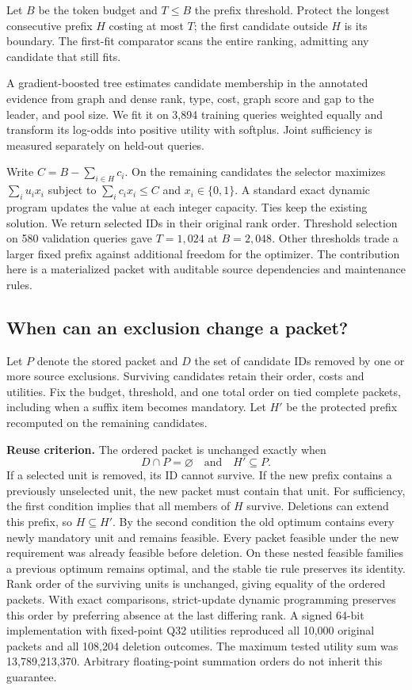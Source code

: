 \documentclass[conference]{IEEEtran}
\begin{document}
Let $B$ be the token budget and $T\leq B$ the prefix threshold. Protect the longest consecutive prefix $H$ costing at most $T$; the first candidate outside $H$ is its boundary. The first-fit comparator scans the entire ranking, admitting any candidate that still fits.

A gradient-boosted tree estimates candidate membership in the annotated evidence from graph and dense rank, type, cost, graph score and gap to the leader, and pool size. We fit it on 3,894 training queries weighted equally and transform its log-odds into positive utility with softplus. Joint sufficiency is measured separately on held-out queries.

Write $C=B-\sum_{i\in H} c_i$. On the remaining candidates the selector maximizes $\sum_i u_i x_i$ subject to $\sum_i c_i x_i\leq C$ and $x_i\in\{0,1\}$. A standard exact dynamic program updates the value at each integer capacity. Ties keep the existing solution. We return selected IDs in their original rank order. Threshold selection on 580 validation queries gave $T=1,024$ at $B=2,048$. Other thresholds trade a larger fixed prefix against additional freedom for the optimizer. The contribution here is a materialized packet with auditable source dependencies and maintenance rules.

\subsection{When can an exclusion change a packet?}
Let $P$ denote the stored packet and $D$ the set of candidate IDs removed by one or more source exclusions. Surviving candidates retain their order, costs and utilities. Fix the budget, threshold, and one total order on tied complete packets, including when a suffix item becomes mandatory. Let $H'$ be the protected prefix recomputed on the remaining candidates.

\textbf{Reuse criterion.} The ordered packet is unchanged exactly when
\[
           D\cap P=\varnothing \quad\text{and}\quad H'\subseteq P.
\]
If a selected unit is removed, its ID cannot survive. If the new prefix contains a previously unselected unit, the new packet must contain that unit. For sufficiency, the first condition implies that all members of $H$ survive. Deletions can extend this prefix, so $H\subseteq H'$. By the second condition the old optimum contains every newly mandatory unit and remains feasible. Every packet feasible under the new requirement was already feasible before deletion. On these nested feasible families a previous optimum remains optimal, and the stable tie rule preserves its identity. Rank order of the surviving units is unchanged, giving equality of the ordered packets. With exact comparisons, strict-update dynamic programming preserves this order by preferring absence at the last differing rank. A signed 64-bit implementation with fixed-point Q32 utilities reproduced all 10,000 original packets and all 108,204 deletion outcomes. The maximum tested utility sum was 13,789,213,370. Arbitrary floating-point summation orders do not inherit this guarantee.
\end{document}
